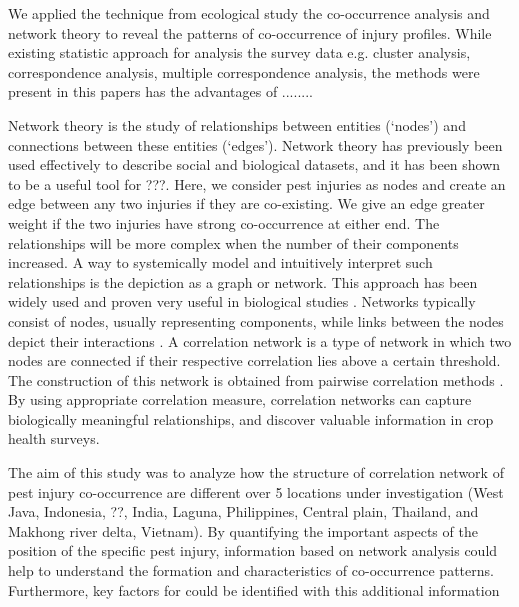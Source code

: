 We applied the technique from ecological study the co-occurrence analysis and network theory to reveal the patterns of co-occurrence of injury profiles. While existing statistic approach for analysis the survey data e.g. cluster analysis, correspondence analysis, multiple correspondence analysis, the methods were present in this papers has the advantages of ........

Network theory is the study of relationships between entities (`nodes') and connections between these entities (`edges'). Network theory has previously been used effectively to describe social and biological datasets, and it has been shown to be a useful tool for ???. Here, we consider pest injuries as nodes and create an edge between any two injuries if they are co-existing. We give an edge greater weight if the two injuries have strong co-occurrence at either end.  The relationships will be more complex when the number of their components increased. A way to systemically model and intuitively interpret such relationships is the depiction as a graph or network. This approach has been widely used and proven very useful in biological studies \cite{Moslonka_Lefebvre_2011}. Networks typically consist of nodes, usually representing components, while links between the nodes depict their interactions \cite{Proulx_2005}. A correlation network is a type of network in which two nodes are connected if their respective correlation lies above a certain threshold. The construction of this network is obtained from pairwise correlation methods \cite{Toubiana_2013}. By using appropriate correlation measure, correlation networks can capture biologically meaningful relationships, and discover valuable information in crop health surveys.

The aim of this study was to analyze how the structure of correlation network of pest injury co-occurrence are different over 5 locations under investigation (West Java, Indonesia, ??, India, Laguna, Philippines, Central plain, Thailand, and Makhong river delta, Vietnam). By quantifying the important aspects of the position of the specific pest injury, information based on network analysis could help to understand the formation and characteristics of co-occurrence patterns. Furthermore, key factors for could be identified with this additional information